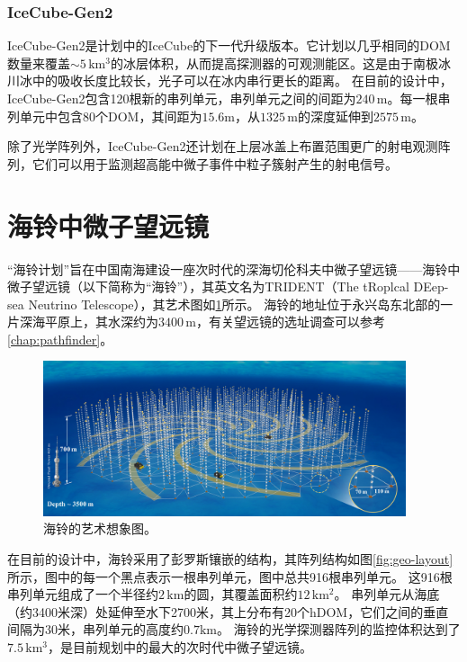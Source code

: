 \subsubsection*{IceCube-Gen2}

IceCube-Gen2是计划中的IceCube的下一代升级版本\cite{IceCube-Gen2_white_paper:2020, IceCube-Gen2_VLVnT:2021}。它计划以几乎相同的DOM数量来覆盖$\sim5\,\mathrm{km^3}$的冰层体积，从而提高探测器的可观测能区。这是由于南极冰川冰中的吸收长度比较长，光子可以在冰内串行更长的距离。
在目前的设计中，IceCube-Gen2包含120根新的串列单元，串列单元之间的间距为$240\,\mathrm{m}$。每一根串列单元中包含80个DOM，其间距为$15.6\mathrm{m}$，从$1325\,\mathrm{m}$的深度延伸到$2575\,\mathrm{m}$。

除了光学阵列外，IceCube-Gen2还计划在上层冰盖上布置范围更广的射电观测阵列，它们可以用于监测超高能中微子事件中粒子簇射产生的射电信号\cite{IceCube-Gen2_radio:2021}。


\section{海铃中微子望远镜}
\label{sec:TRIDENT_array}

“海铃计划”旨在中国南海建设一座次时代的深海切伦科夫中微子望远镜——海铃中微子望远镜（以下简称为“海铃”），其英文名为TRIDENT（The tRoplcal DEep-sea Neutrino Telescope），其艺术图如\ref{fig:TRIDENT_array}所示。
海铃的地址位于永兴岛东北部的一片深海平原上，其水深约为$3400\,\mathrm{m}$，有关望远镜的选址调查可以参考\ref{chap:pathfinder}。

\begin{figure}[!htb]%
    \centering
    \includegraphics[width=0.95\textwidth]{img/TRIDENT_array.jpeg}
    \caption{海铃的艺术想象图。}
    \label{fig:TRIDENT_array}
\end{figure}

在目前的设计中，海铃采用了彭罗斯镶嵌的结构，其阵列结构如图\ref{fig:geo-layout}所示，图中的每一个黑点表示一根串列单元，图中总共916根串列单元。
这916根串列单元组成了一个半径约$2\,\mathrm{km}$的圆，其覆盖面积约$12\,\mathrm{km^2}$。
串列单元从海底（约3400米深）处延伸至水下2700米，其上分布有20个hDOM，它们之间的垂直间隔为30米，串列单元的高度约$0.7\mathrm{km}$。
海铃的光学探测器阵列的监控体积达到了$7.5\,\mathrm{km^3}$，是目前规划中的最大的次时代中微子望远镜。


